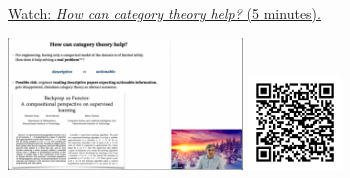 
\begin{minipage}{10cm}
    \href{https://act4e-spring21.netlify.app/videos/spring2021-functorial-comp-a:how-cat-helps.html}{Watch: \emph{How can category theory help?} (5 minutes).}
        
    \href{https://act4e-spring21.netlify.app/videos/spring2021-functorial-comp-a:how-cat-helps.html}{\includegraphics[height=3.5cm]{spring2021-functorial-comp-a:how-cat-helps/thumbnails.jpg}}
    \href{https://act4e-spring21.netlify.app/videos/spring2021-functorial-comp-a:how-cat-helps.html}{\includegraphics[height=2.5cm]{spring2021-functorial-comp-a:how-cat-helps/qrcode.png}}
\end{minipage}
